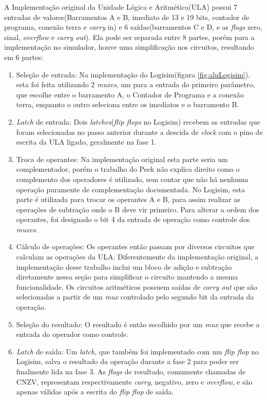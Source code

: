 \documentclass[
	article,			%
	11pt,				%
	oneside,			%
	a4paper,			%
	english,			%
	brazil,				%
	sumario=tradicional
	]{abntex2}
\begin{document}
A Implementação original da Unidade Lógica e Aritmética(ULA) possui 7 entradas de valores(Barramentos A e B, imediato de 13 e 19 bits, contador de programa, conexão terra e \textit{carry} in) e 6 saídas(barramentos C e D, e as \textit{flags} zero, sinal, \textit{overflow} e \textit{carry out}). Ela pode ser separada entre 8 partes, porém para a implementação no simulador, houve uma simplificação nos circuitos, resultando em 6 partes:
\begin{enumerate}
    \item Seleção de entrada: Na implementação do Logisim(figura \ref{fig:aluLogisim}), esta foi feita utilizando 2 \textit{muxes}, um para a entrada do primeiro parâmetro, que escolhe entre o barramento A, o Contador de Programa e a conexão terra, enquanto o outro seleciona entre os imediatos e o barramento B.
    \item \textit{Latch} de entrada: Dois \textit{latches}(\textit{flip flops} no Logisim) recebem as entradas que foram selecionadas no passo anterior durante a descida de \textit{clock} com o pino de escrita da ULA ligado, geralmente na fase 1.
    \item Troca de operantes: Na implementação original esta parte seria um complementador, porém o trabalho do Peek não explica direito como o complemento dos operadores é utilizado, sem contar que não há nenhuma operação puramente de complementação documentada. No Logisim, esta parte é utilizada para trocar os operantes A e B, para assim realizar as operações de subtração onde o B deve vir primeiro. Para alterar a ordem dos operantes, foi designado o bit 4 da entrada de operação como controle dos \textit{muxes}.
    \item Cálculo de operações: Os operantes então passam por diversos circuitos que calculam as operações da ULA. Diferentemente da implementação original, a implementação desse trabalho inclui um bloco de adição e subtração diretamente nessa seção para simplificar o circuito mantendo a mesma funcionalidade. Os circuitos aritméticos possuem saídas de \textit{carry out} que são selecionadas a partir de um \textit{mux} controlado pelo segundo bit da entrada da operação.      
    \item Seleção do resultado: O resultado é então escolhido por um \textit{mux} que recebe a entrada do operador como controle.
    \item \textit{Latch} de saída: Um \textit{latch}, que também foi implementado com um \textit{flip flop} no Logisim, salva o resultado da operação durante a fase 2 para poder ser finalmente lida na fase 3. As \textit{flags} de resultado, comumente chamadas de CNZV, representam respectivamente \textit{carry}, negativo, zero e \textit{overflow}, e são apenas válidas após a escrita do \textit{flip flop} de saída.
\end{enumerate}
\end{document}
